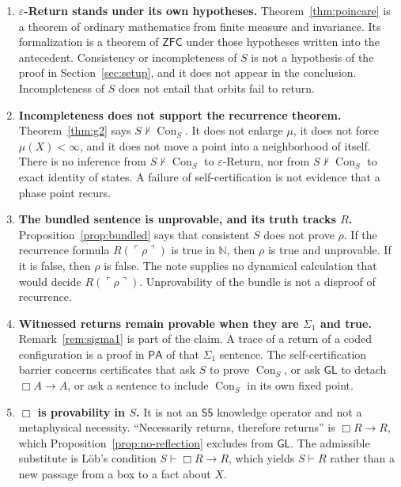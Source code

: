 \documentclass[11pt]{article}
\newcommand{\Nat}{\mathbb{N}}
\newcommand{\gn}[1]{\ulcorner #1 \urcorner}
\DeclareMathOperator{\Con}{Con}
\newcommand{\PA}{\mathsf{PA}}
\newcommand{\ZFC}{\mathsf{ZFC}}
\newcommand{\GL}{\mathsf{GL}}
\theoremstyle{definition}
\theoremstyle{remark}
\begin{document}
\begin{enumerate}
\item \textbf{\(\varepsilon\)-Return stands under its own hypotheses.}
Theorem~\ref{thm:poincare} is a theorem of ordinary mathematics from finite measure and invariance.
Its formalization is a theorem of \(\ZFC\) under those hypotheses written into the antecedent.
Consistency or incompleteness of \(S\) is not a hypothesis of the proof in Section~\ref{sec:setup}, and it does not appear in the conclusion.
Incompleteness of \(S\) does not entail that orbits fail to return.

\item \textbf{Incompleteness does not support the recurrence theorem.}
Theorem~\ref{thm:g2} says \(S\nvdash\Con_{S}\).
It does not enlarge \(\mu\), it does not force \(\mu(X)<\infty\), and it does not move a point into a neighborhood of itself.
There is no inference from \(S\nvdash\Con_{S}\) to \(\varepsilon\)-Return, nor from \(S\nvdash\Con_{S}\) to exact identity of states.
A failure of self-certification is not evidence that a phase point recurs.

\item \textbf{The bundled sentence is unprovable, and its truth tracks \(R\).}
Proposition~\ref{prop:bundled} says that consistent \(S\) does not prove \(\rho\).
If the recurrence formula \(R(\gn{\rho})\) is true in \(\Nat\), then \(\rho\) is true and unprovable.
If it is false, then \(\rho\) is false.
The note supplies no dynamical calculation that would decide \(R(\gn{\rho})\).
Unprovability of the bundle is not a disproof of recurrence.

\item \textbf{Witnessed returns remain provable when they are \(\Sigma_1\) and true.}
Remark~\ref{rem:sigma1} is part of the claim.
A trace of a return of a coded configuration is a proof in \(\PA\) of that \(\Sigma_1\) sentence.
The self-certification barrier concerns certificates that ask \(S\) to prove \(\Con_{S}\), or ask \(\GL\) to detach \(\Box A\to A\), or ask a sentence to include \(\Con_{S}\) in its own fixed point.

\item \textbf{\(\Box\) is provability in \(S\).}
It is not an \(\mathsf{S5}\) knowledge operator and not a metaphysical necessity.
``Necessarily returns, therefore returns'' is \(\Box R\to R\), which Proposition~\ref{prop:no-reflection} excludes from \(\GL\).
The admissible substitute is L\"ob's condition \(S\vdash\Box R\to R\), which yields \(S\vdash R\) rather than a new passage from a box to a fact about \(X\).


\end{enumerate}
\end{document}
